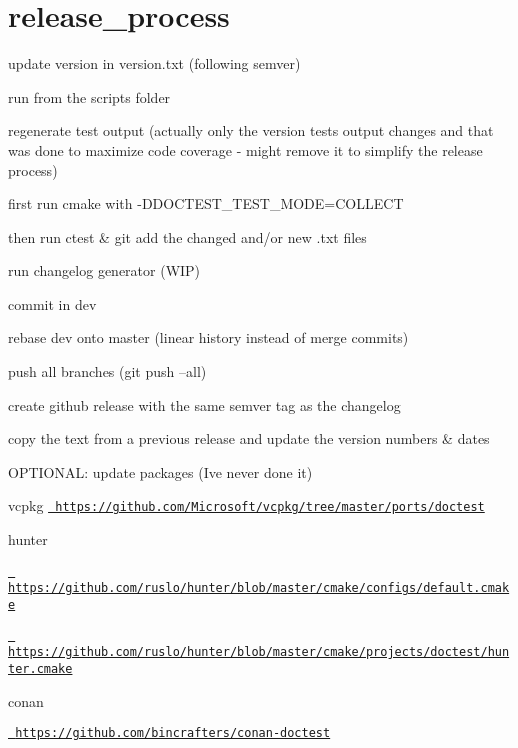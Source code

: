 \chapter{release\+\_\+process}
\hypertarget{md_doctest_2scripts_2release__process}{}\label{md_doctest_2scripts_2release__process}

\begin{DoxyItemize}
\item update version in version.\+txt (following semver)
\item run  from the scripts folder
\item regenerate test output (actually only the {\ttfamily version} test\textquotesingle{}s output changes and that was done to maximize code coverage -\/ might remove it to simplify the release process)
\begin{DoxyItemize}
\item first run cmake with -\/DDOCTEST\+\_\+\+TEST\+\_\+\+MODE=COLLECT
\item then run ctest \& git add the changed and/or new .txt files
\end{DoxyItemize}
\item run changelog generator (WIP)
\item commit in dev
\item rebase dev onto master (linear history instead of merge commits)
\item push all branches (git push --all)
\item create github release with the same semver tag as the changelog
\begin{DoxyItemize}
\item copy the text from a previous release and update the version numbers \& dates
\end{DoxyItemize}
\item OPTIONAL\+: update packages (I\textquotesingle{}ve never done it)
\begin{DoxyItemize}
\item vcpkg \href{https://github.com/Microsoft/vcpkg/tree/master/ports/doctest}{\texttt{ https\+://github.\+com/\+Microsoft/vcpkg/tree/master/ports/doctest}}
\item hunter
\begin{DoxyItemize}
\item \href{https://github.com/ruslo/hunter/blob/master/cmake/configs/default.cmake}{\texttt{ https\+://github.\+com/ruslo/hunter/blob/master/cmake/configs/default.\+cmake}}
\item \href{https://github.com/ruslo/hunter/blob/master/cmake/projects/doctest/hunter.cmake}{\texttt{ https\+://github.\+com/ruslo/hunter/blob/master/cmake/projects/doctest/hunter.\+cmake}}
\end{DoxyItemize}
\item conan
\begin{DoxyItemize}
\item \href{https://github.com/bincrafters/conan-doctest}{\texttt{ https\+://github.\+com/bincrafters/conan-\/doctest}} 
\end{DoxyItemize}
\end{DoxyItemize}
\end{DoxyItemize}